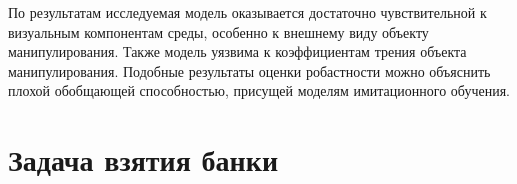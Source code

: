             \begin{table}[h]
              \caption{Результаты валидации модели BC на задаче с отрытием шкафа}
              \label{res-Table1}
              
            \end{table}

            По результатам исследуемая модель оказывается достаточно чувствительной к визуальным компонентам среды, особенно к внешнему виду объекту манипулирования. Также модель уязвима к коэффициентам трения объекта манипулирования. Подобные результаты оценки робастности можно объяснить плохой обобщающей способностью, присущей моделям имитационного обучения. 

    \section{Задача взятия банки}


